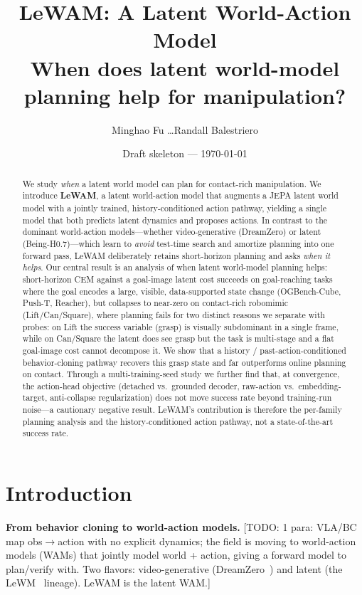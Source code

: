 \documentclass[11pt]{article}
\title{\textbf{LeWAM}: A Latent World-Action Model\\ \large When does latent world-model planning help for manipulation?}
\author{Minghao Fu \quad \ldots \quad Randall Balestriero}
\date{Draft skeleton --- \today}
\newcommand{\todo}[1]{{\color{red}[TODO: #1]}}
\begin{document}
\maketitle

\begin{abstract}
We study \emph{when} a latent world model can plan for contact-rich manipulation. We introduce \textbf{LeWAM}, a latent world-action model that augments a JEPA latent world model with a jointly trained, history-conditioned action pathway, yielding a single model that both predicts latent dynamics and proposes actions. In contrast to the dominant world-action models---whether video-generative (DreamZero) or latent (Being-H0.7)---which learn to \emph{avoid} test-time search and amortize planning into one forward pass, LeWAM deliberately retains short-horizon planning and asks \emph{when it helps}. Our central result is an analysis of when latent world-model planning helps: short-horizon CEM against a goal-image latent cost succeeds on goal-reaching tasks where the goal encodes a large, visible, data-supported state change (OGBench-Cube, Push-T, Reacher), but collapses to near-zero on contact-rich robomimic (Lift/Can/Square), where planning fails for two distinct reasons we separate with probes: on Lift the success variable (grasp) is visually subdominant in a single frame, while on Can/Square the latent does see grasp but the task is multi-stage and a flat goal-image cost cannot decompose it. We show that a history / past-action-conditioned behavior-cloning pathway recovers this grasp state and far outperforms online planning on contact. Through a multi-training-seed study we further find that, at convergence, the action-head objective (detached vs.\ grounded decoder, raw-action vs.\ embedding-target, anti-collapse regularization) does not move success rate beyond training-run noise---a cautionary negative result. LeWAM's contribution is therefore the per-family planning analysis and the history-conditioned action pathway, not a state-of-the-art success rate.
\end{abstract}

\section{Introduction}
\textbf{From behavior cloning to world-action models.} \todo{1 para: VLA/BC map obs$\to$action with no explicit dynamics; the field is moving to world-action models (WAMs) that jointly model world + action, giving a forward model to plan/verify with. Two flavors: video-generative (DreamZero~\cite{dreamzero}) and latent (the LeWM~\cite{lewm} lineage). LeWAM is the latent WAM.}
\end{document}
